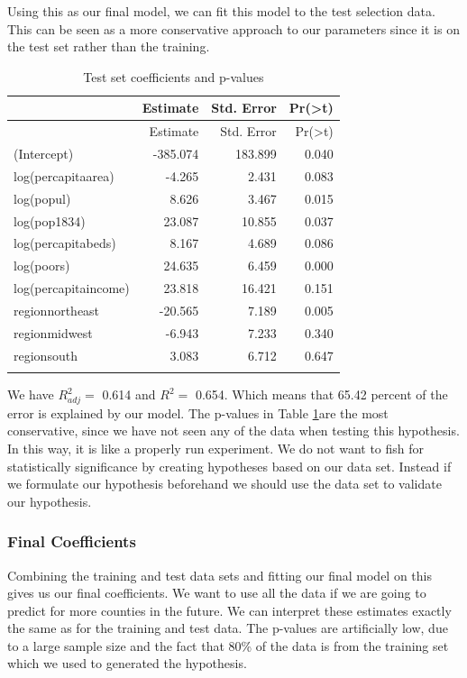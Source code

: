 \documentclass[]{article}
\begin{document}

Using this as our final model, we can fit this model to the test
selection data. This can be seen as a more conservative approach to our
parameters since it is on the test set rather than the training.

\begin{longtable}[]{@{}lrrr@{}}
\caption{Test set coefficients and p-values}\tabularnewline
\toprule
& Estimate & Std. Error &
Pr(\textgreater{}\textbar{}t\textbar{})\tabularnewline
\midrule
\endfirsthead
\toprule
& Estimate & Std. Error &
Pr(\textgreater{}\textbar{}t\textbar{})\tabularnewline
\midrule
\endhead
(Intercept) & -385.074 & 183.899 & 0.040\tabularnewline
log(percapitaarea) & -4.265 & 2.431 & 0.083\tabularnewline
log(popul) & 8.626 & 3.467 & 0.015\tabularnewline
log(pop1834) & 23.087 & 10.855 & 0.037\tabularnewline
log(percapitabeds) & 8.167 & 4.689 & 0.086\tabularnewline
log(poors) & 24.635 & 6.459 & 0.000\tabularnewline
log(percapitaincome) & 23.818 & 16.421 & 0.151\tabularnewline
regionnortheast & -20.565 & 7.189 & 0.005\tabularnewline
regionmidwest & -6.943 & 7.233 & 0.340\tabularnewline
regionsouth & 3.083 & 6.712 & 0.647\tabularnewline
\bottomrule
\label{table:summ_test}
\end{longtable}

We have \(R^2_{adj} =\) 0.614 and \(R^2 =\) 0.654. Which means that
65.42 percent of the error is
explained by our model. The p-values in Table \ref{table:summ_test}are the most
conservative, since we have not seen any of the data when testing this
hypothesis. In this way, it is like a properly run experiment. We do not
want to fish for statistically significance by creating hypotheses based
on our data set. Instead if we formulate our hypothesis beforehand we
should use the data set to validate our hypothesis.

\subsubsection{Final Coefficients}\label{final-coefficients}

Combining the training and test data sets and fitting our final model on
this gives us our final coefficients. We want to use all the data if we
are going to predict for more counties in the future. We can interpret
these estimates exactly the same as for the training and test data. The
p-values are artificially low, due to a large sample size and the fact
that 80\% of the data is from the training set which we used to
generated the hypothesis.
\end{document}
